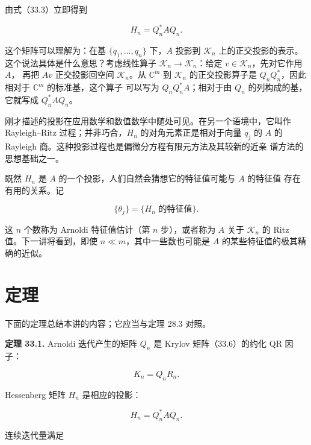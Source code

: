 \documentclass[UTF8,fontset=none,12pt]{ctexart}
\begin{document}
由式（33.3）立即得到

\begin{equation}
H_n=Q_n^*AQ_n.
\tag{33.9}
\end{equation}

这个矩阵可以理解为：在基 $\{q_1,\ldots,q_n\}$ 下，$A$ 投影到 $\mathcal K_n$
上的正交投影的表示。这个说法具体是什么意思？考虑线性算子
$\mathcal K_n\to\mathcal K_n$：给定 $v\in\mathcal K_n$，先对它作用 $A$，
再把 $Av$ 正交投影回空间 $\mathcal K_n$。从 $\mathbb C^m$ 到 $\mathcal K_n$
的正交投影算子是 $Q_nQ_n^*$，因此相对于 $\mathbb C^m$ 的标准基，这个算子
可以写为 $Q_nQ_n^*A$；相对于由 $Q_n$ 的列构成的基，它就写成 $Q_n^*AQ_n$。

\begin{sloppypar}
刚才描述的投影在应用数学和数值数学中随处可见。在另一个语境中，它叫作
Rayleigh--Ritz 过程；并非巧合，$H_n$ 的对角元素正是相对于向量 $q_j$ 的
$A$ 的 Rayleigh 商。这种投影过程也是偏微分方程有限元方法及其较新的近亲
谱方法的思想基础之一。
\end{sloppypar}

既然 $H_n$ 是 $A$ 的一个投影，人们自然会猜想它的特征值可能与 $A$ 的特征值
存在有用的关系。记

\begin{equation}
\{\theta_j\}=\{\text{$H_n$ 的特征值}\}.
\tag{33.10}
\end{equation}

这 $n$ 个数称为 Arnoldi 特征值估计（第 $n$ 步），或者称为 $A$ 关于
$\mathcal K_n$ 的 Ritz 值。下一讲将看到，即使 $n\ll m$，其中一些数也可能是
$A$ 的某些特征值的极其精确的近似。

\section*{定理}

下面的定理总结本讲的内容；它应当与定理 28.3 对照。

\textbf{定理 33.1.}
Arnoldi 迭代产生的矩阵 $Q_n$ 是 Krylov 矩阵（33.6）的约化 QR 因子：

\begin{equation}
K_n=Q_nR_n.
\tag{33.11}
\end{equation}

Hessenberg 矩阵 $H_n$ 是相应的投影：

\begin{equation}
H_n=Q_n^*AQ_n.
\tag{33.12}
\end{equation}

连续迭代量满足
\end{document}
